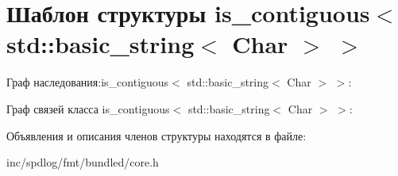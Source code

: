 \hypertarget{structis__contiguous_3_01std_1_1basic__string_3_01Char_01_4_01_4}{}\section{Шаблон структуры is\+\_\+contiguous$<$ std\+:\+:basic\+\_\+string$<$ Char $>$ $>$}
\label{structis__contiguous_3_01std_1_1basic__string_3_01Char_01_4_01_4}


Граф наследования\+:is\+\_\+contiguous$<$ std\+:\+:basic\+\_\+string$<$ Char $>$ $>$\+:


Граф связей класса is\+\_\+contiguous$<$ std\+:\+:basic\+\_\+string$<$ Char $>$ $>$\+:


Объявления и описания членов структуры находятся в файле\+:\begin{DoxyCompactItemize}
\item 
inc/spdlog/fmt/bundled/core.\+h\end{DoxyCompactItemize}
